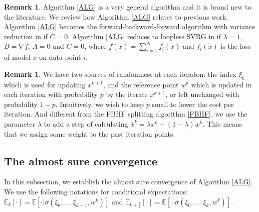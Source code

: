 \documentclass[a4paper,12pt]{article}
\theoremstyle{definition}
\newtheorem{rem}[dfn]{Remark}
\begin{document}
\begin{rem}
\rm

Algorithm \ref{ALG} is a very general algorithm and it is brand new to the literature. We review how Algorithm \ref{ALG} relates to previous work. Algorithm \ref{ALG} becomes the forward-backward-forward algorithm with variance reduction in \cite{Alacaoglu-Malitsky} if $C=0$. Algorithm \ref{ALG} reduces to loopless SVRG in \cite{KHR} if $\lambda=1$,
$B=\nabla f$, $A=0$ and $C=0$, where $f(x)=\sum_{i=1}^Nf_i(x)$ and $f_i(x)$ is the loss of model $x$ on data point $i$.

\end{rem}
\begin{rem}
We have two sources of randomness at each iteraton: the index $\xi_k$ which is used for updating $x^{k+1}$, and the reference point $w^k$ which is updated in each iteration with probability $p$ by the iterate $x^{k+1}$, or left unchanged with probability $1-p$. Intuitively, we wish to keep $p$ small to lower the cost per iteration. And different from the FBHF splitting algorithm \eqref{FBHF}, we use the parameter $\lambda $ to add a step of calculating $\bar x^k=\lambda x^k+(1-\lambda)w^k$. This means that we assign some weight to the past iteration points.
\end{rem}
\subsection{The almost sure convergence}

In this subsection, we establish the almost sure convergence of Algorithm \ref{ALG}. We use the following notations for conditional expectations: $\mathbb{E}_k[\cdot]=\mathbb{E}[\cdot|\sigma(\xi_0,...,\xi_{k-1},w^{k})]$ and $\mathbb{E}_{k+\frac{1}{2}}[\cdot]=\mathbb{E}[\cdot|\sigma(\xi_0,...,\xi_{k},w^{k})]$.
\end{document}
